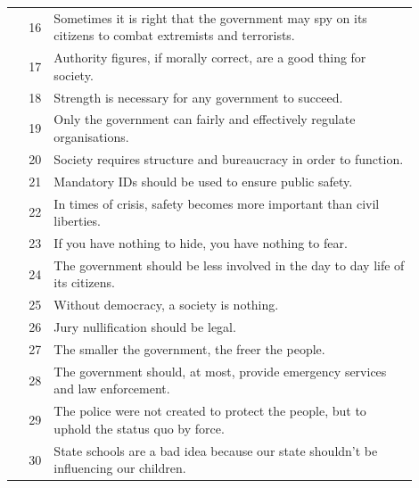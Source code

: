 \documentclass[11pt]{article}
\begin{document}
\begin{longtable}{r p{0.9\linewidth}}
\rowcolor{svAuth} 16 & Sometimes it is right that the government may spy on its citizens to combat extremists and terrorists. \\
\rowcolor{svAuth} 17 & Authority figures, if morally correct, are a good thing for society. \\
\rowcolor{svAuth} 18 & Strength is necessary for any government to succeed. \\
\rowcolor{svAuth} 19 & Only the government can fairly and effectively regulate organisations. \\
\rowcolor{svAuth} 20 & Society requires structure and bureaucracy in order to function. \\
\rowcolor{svAuth} 21 & Mandatory IDs should be used to ensure public safety. \\
\rowcolor{svAuth} 22 & In times of crisis, safety becomes more important than civil liberties. \\
\rowcolor{svAuth} 23 & If you have nothing to hide, you have nothing to fear. \\
\rowcolor{svAuth} 24 & The government should be less involved in the day to day life of its citizens. \\
\rowcolor{svAuth} 25 & Without democracy, a society is nothing. \\
\rowcolor{svAuth} 26 & Jury nullification should be legal. \\
\rowcolor{svAuth} 27 & The smaller the government, the freer the people. \\
\rowcolor{svAuth} 28 & The government should, at most, provide emergency services and law enforcement. \\
\rowcolor{svAuth} 29 & The police were not created to protect the people, but to uphold the status quo by force. \\
\rowcolor{svAuth} 30 & State schools are a bad idea because our state shouldn't be influencing our children. \\


\end{longtable}
\end{document}
